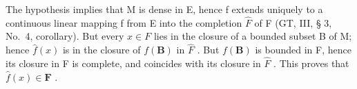 The hypothesis implies that M is dense in E, hence f extends uniquely to a continuous linear mapping f from E into the completion \(\hat{F}\) of F (GT, III, § 3, No.~4, corollary). But every \(x \in F\) lies in the closure of a bounded subset B of M; hence \(\hat{f}(x)\) is in the closure of \(f(\mathbf{B})\) in \(\hat{F}\) . But \(f(\mathbf{B})\) is bounded in F, hence its closure in F is complete, and coincides with its closure in \(\hat{F}\) . This proves that \(\hat{f}(x) \in \mathbf{F}\) .

